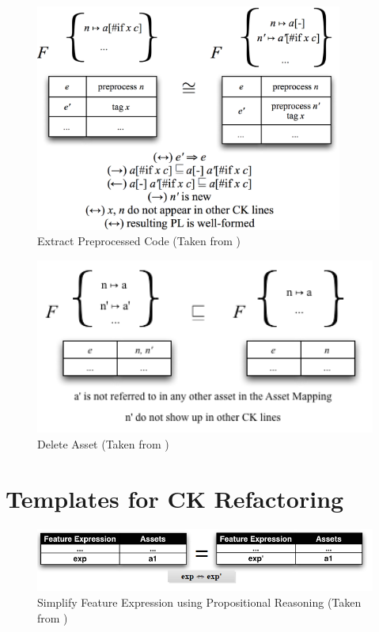 \documentclass[12pt]{article}
\begin{document}
\begin{figure}[H]
\centering
\includegraphics[width=0.9\textwidth, frame]{images/Template5T}
\caption{Extract Preprocessed Code (Taken from \cite{twiki})}
\end{figure}

\begin{figure}[H]
\centering
\includegraphics[width=1\textwidth, frame]{images/TemplatesDeleteAsset}
\caption{Delete Asset (Taken from \cite{twiki})}
\end{figure}

\pagebreak
\section{Templates for CK Refactoring}

\begin{figure}[H]
\centering
\includegraphics[width=1\textwidth, frame]{images/SimplifyFeatureExpression}
\caption{Simplify Feature Expression using Propositional Reasoning (Taken from \cite{msclmt})}
\end{figure}
\end{document}
